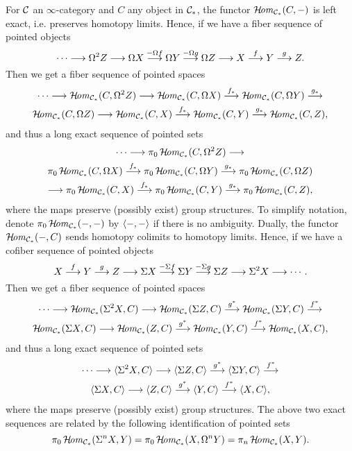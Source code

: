 {For $\Cc$ an $\infty$-category and $C$ any object in $\Cc_{\ast}$, 
the functor $\HHom_{\Cc_{\ast}}(C,-)$ is left exact, i.e. preserves 
homotopy limits. 
Hence, if we have a fiber sequence of pointed objects
\[
\cdots\To\Omega^2 Z\To
\Omega X\markar{-\Omega f}\Omega Y\markar{-\Omega g}\Omega Z
\To X\markar{f}Y\markar{g}Z.
\]
Then we get a fiber sequence of pointed spaces
\begin{multline*}
\cdots\To\HHom_{\Cc_{\ast}}(C,\Omega^2 Z)\To 
\HHom_{\Cc_{\ast}}(C,\Omega X)\markar{f_{\ast}}
\HHom_{\Cc_{\ast}}(C,\Omega Y)\markar{g_{\ast}}\\
\HHom_{\Cc_{\ast}}(C,\Omega Z)
\To \HHom_{\Cc_{\ast}}(C,X)\markar{f_{\ast}}
\HHom_{\Cc_{\ast}}(C,Y)\markar{g_{\ast}}
\HHom_{\Cc_{\ast}}(C,Z),
\end{multline*}
and thus a long exact sequence of pointed sets
\begin{multline*}
\cdots\To\pi_0\HHom_{\Cc_{\ast}}(C,\Omega^2 Z)\To\\
\pi_0\HHom_{\Cc_{\ast}}(C,\Omega X)\markar{f_{\ast}}
\pi_0\HHom_{\Cc_{\ast}}(C,\Omega Y)\markar{g_{\ast}}
\pi_0\HHom_{\Cc_{\ast}}(C,\Omega Z)\\
\To\pi_0\HHom_{\Cc_{\ast}}(C,X)\markar{f_{\ast}}
\pi_0\HHom_{\Cc_{\ast}}(C,Y)\markar{g_{\ast}}
\pi_0\HHom_{\Cc_{\ast}}(C,Z),
\end{multline*}
where the maps preserve (possibly exist) group structures. 
To simplify notation, denote $\pi_0\HHom_{\Cc_{\ast}}(-,-)$ by 
$\<-,-\>$ if there is no ambiguity.
Dually, the functor $\HHom_{\Cc_{\ast}}(-,C)$ 
sends homotopy colimits to homotopy limits. 
Hence, if we have a cofiber sequence of pointed objects
\[
X\markar{f}Y\markar{g}Z\To
\Sigma X\markar{-\Sigma f}\Sigma Y\markar{-\Sigma g}\Sigma Z
\To\Sigma^2 X\To\cdots.
\]
Then we get a fiber sequence of pointed spaces
\begin{multline*}
\cdots\To\HHom_{\Cc_{\ast}}(\Sigma^2 X,C)\To 
\HHom_{\Cc_{\ast}}(\Sigma Z,C)\markar{g^{\ast}}
\HHom_{\Cc_{\ast}}(\Sigma Y,C)\markar{f^{\ast}}\\
\HHom_{\Cc_{\ast}}(\Sigma X,C)
\To \HHom_{\Cc_{\ast}}(Z,C)\markar{g^{\ast}}
\HHom_{\Cc_{\ast}}(Y,C)\markar{f^{\ast}}
\HHom_{\Cc_{\ast}}(X,C),
\end{multline*}
and thus a long exact sequence of pointed sets
\begin{multline*}
\cdots\To
\<\Sigma^2 X,C\>\To
\<\Sigma Z,C\>\markar{g^{\ast}}
\<\Sigma Y,C\>\markar{f^{\ast}}\\
\<\Sigma X,C\>\To
\<Z,C\>\markar{g^{\ast}}
\<Y,C\>\markar{f^{\ast}}
\<X,C\>,
\end{multline*}
where the maps preserve (possibly exist) group structures.
The above two exact sequences are related by the following
identification of pointed sets
\[
\pi_0\HHom_{\Cc_{\ast}}(\Sigma^n X,Y)=
\pi_0\HHom_{\Cc_{\ast}}(X,\Omega^n Y)=
\pi_n\HHom_{\Cc_{\ast}}(X,Y).
\]

}

